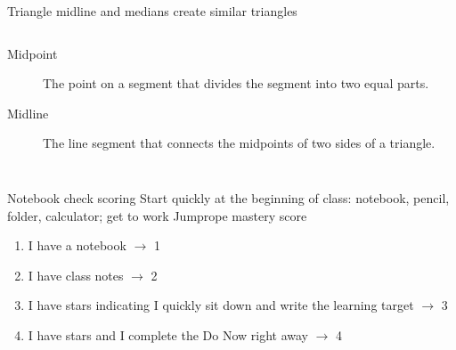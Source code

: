 \documentclass[onlytextwidth, aspectratio=169]{beamer}
\begin{document}
\begin{frame}{Triangle midline and medians create similar triangles}
  \begin{columns}
      \begin{description}
        \item[Midpoint] The point on a segment that divides the segment into two equal parts.
        \item[Midline] The line segment that connects the midpoints of two sides of a triangle.
      \end{description}
    \begin{flushright}
    \end{flushright}
  \end{columns}
\end{frame}

\begin{frame}{Notebook check scoring}
  {Start quickly at the beginning of class: notebook, pencil, folder, calculator; get to work}
    Jumprope mastery score
    \begin{enumerate}
      \item I have a notebook $\rightarrow$ 1
      \item I have class notes $\rightarrow$ 2
      \item I have stars indicating I quickly sit down and write the learning target $\rightarrow$ 3
      \item I have stars and I complete the Do Now right away $\rightarrow$ 4
    \end{enumerate} \bigskip
\end{frame}
\end{document}

